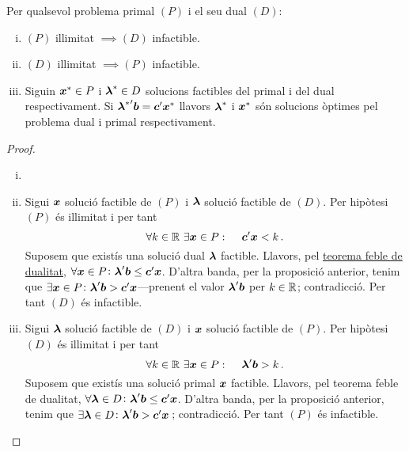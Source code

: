 \begin{col}\label{col:feb}
	Per qualsevol problema primal $(P)$ i el seu dual $(D)$: 
	\begin{enumerate}[i)]
		\item $\left(P\right)$ il\lgem limitat $\implies \left(D\right)$ 
		infactible.
		\item $\left(D\right)$ il\lgem limitat $\implies \left(P\right)$ 
		infactible.
		\item Siguin $\boldsymbol{\boldsymbol{x}}^\ast \in P$ i $\boldsymbol{\boldsymbol{\lambda}}^\ast \in D$
		solucions factibles del primal i del dual respectivament. Si
		${\boldsymbol{\boldsymbol{\lambda}}^\ast}'\boldsymbol{b} = \boldsymbol{\boldsymbol{c}}'\boldsymbol{\boldsymbol{x}}^\ast$ llavors
		$\boldsymbol{\boldsymbol{\lambda}}^\ast$ i $\boldsymbol{\boldsymbol{x}}^\ast$ són solucions òptimes pel 
		problema
		dual i primal respectivament.
	\end{enumerate}
	\begin{proof}
		\begin{enumerate}[i)]
			\item[]
			\item Sigui $\boldsymbol{\boldsymbol{x}}$ solució factible de $(P)$ i 
			$\boldsymbol{\boldsymbol{\lambda}}$
			solució factible de $(D)$. Per hipòtesi $(P)$ és il\lgem limitat i 
			per 
			tant \[\forall
			k \in \mathbb{R}\ \exists \boldsymbol{x}\in P\operatorname{\colon\quad} \boldsymbol{c}'\boldsymbol{x} < k\,. \] 
			Suposem que
			existís una solució dual $\boldsymbol{\lambda}$ factible. Llavors, pel
			\hyperref[teo:dualitat-feble]{teorema feble de dualitat}, $\forall
			\boldsymbol{\boldsymbol{x}}\in P\colon \boldsymbol{\boldsymbol{\lambda}}'\boldsymbol{b} \le 
			\boldsymbol{\boldsymbol{c}}'\boldsymbol{\boldsymbol{x}}$.
			D'altra banda, per la proposició anterior, tenim que $\exists 
			\boldsymbol{\boldsymbol{x}}\in
			P\colon \boldsymbol{\boldsymbol{\lambda}}'\boldsymbol{b} > 
			\boldsymbol{\boldsymbol{c}}'\boldsymbol{\boldsymbol{x}}$---prenent el valor
			$\boldsymbol{\boldsymbol{\lambda}}'\boldsymbol{b}$ per $k\in\mathbb{R}$; contradicció. Per tant 
			$(D)$ és
			infactible.
			\item Sigui $\boldsymbol{\boldsymbol{\lambda}}$ solució factible de $(D)$ i 
			$\boldsymbol{\boldsymbol{x}}$
			solució factible de $(P)$. Per hipòtesi $(D)$ és il\lgem limitat i 
			per 
			tant \[\forall
			k \in \mathbb{R}\ \exists \boldsymbol{\boldsymbol{x}}\in P\operatorname{\colon\quad} 
			\boldsymbol{\boldsymbol{\lambda}}'\boldsymbol{b} > k\,. \]
			Suposem que existís una solució primal $\boldsymbol{\boldsymbol{x}}$ factible. 
			Llavors, pel
			{teorema feble de dualitat}, $\forall \boldsymbol{\boldsymbol{\lambda}}\in D\colon
			\boldsymbol{\boldsymbol{\lambda}}'\boldsymbol{b} \le \boldsymbol{\boldsymbol{c}}'\boldsymbol{\boldsymbol{x}}$. D'altra 
			banda, per la
			proposició anterior, tenim que $\exists \boldsymbol{\lambda}\in D\colon
			\boldsymbol{\lambda}'\boldsymbol{b} > \boldsymbol{c}'\boldsymbol{x}\,$; contradicció. Per tant 
			$(P)$ és
			infactible.

\end{enumerate}
\end{proof}
\end{col}

